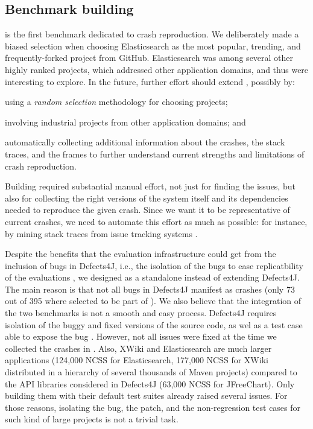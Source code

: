 \subsection{Benchmark building}

\crashpack is the first benchmark dedicated to crash reproduction.
We deliberately made a biased selection when choosing Elasticsearch as the most popular, trending, and frequently-forked project from GitHub.
Elasticsearch was among several other highly ranked projects, which addressed other application domains, and thus were interesting to explore.
In the future, further effort should extend \crashpack, possibly by:
\begin{inparaenum}[(i)]
\item using a \textit{random selection} methodology for choosing projects; 
\item involving industrial projects from other application domains;
and \item automatically collecting additional information about the crashes, the stack traces, and the frames to further understand current strengths and limitations of crash reproduction.
\end{inparaenum}

Building \crashpack required substantial manual effort, not just for finding the issues, but also for collecting the right versions of the system itself and its dependencies needed  to reproduce the given crash.
Since we want it to be representative of current crashes, we need to automate this effort as much as possible: for instance, by mining stack traces from issue tracking systems \cite{Nayrolles2016}.

Despite the benefits that the evaluation infrastructure could get from the inclusion of \crashpack bugs in Defects4J, i.e., the isolation of the bugs to ease replicatbility of the evaluations \cite{just2014defects4j}, we designed \crashpack as a standalone instead of extending Defects4J.
The main reason is that not all bugs in Defects4J manifest as crashes (only 73 out of 395 where selected to be part of \crashpack). 
We also believe that the integration of the two benchmarks is not a smooth and easy process.
Defects4J requires isolation of the buggy and fixed versions of the source code, as wel as a test case able to expose the bug \cite{just2014defects4j}. However, not all issues were fixed at the time we collected the crashes in \crashpack.
Also, XWiki and Elasticsearch are much larger applications (124,000 NCSS for Elasticsearch, 177,000 NCSS for XWiki distributed in a hierarchy of several thousands of Maven projects) compared to the API libraries considered in Defects4J (63,000 NCSS for JFreeChart). 
Only building them with their default test suites already raised several issues. 
For those reasons, isolating the bug, the patch, and the non-regression test cases for such kind of large projects is not a trivial task. 







